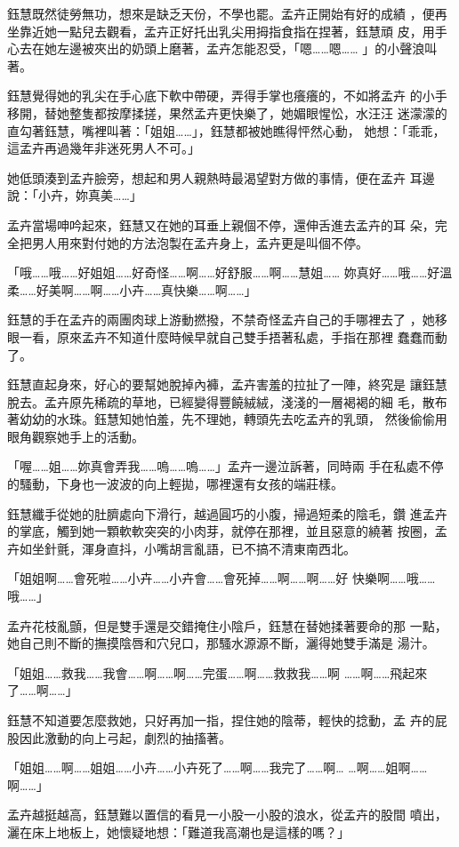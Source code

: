 鈺慧既然徒勞無功，想來是缺乏天份，不學也罷。孟卉正開始有好的成績
，便再坐靠近她一點兒去觀看，孟卉正好托出乳尖用拇指食指在捏著，鈺慧頑
皮，用手心去在她左邊被夾出的奶頭上磨著，孟卉怎能忍受，「嗯……嗯……
」的小聲浪叫著。

鈺慧覺得她的乳尖在手心底下軟中帶硬，弄得手掌也癢癢的，不如將孟卉
的小手移開，替她整隻都按摩揉搓，果然孟卉更快樂了，她媚眼惺忪，水汪汪
迷濛濛的直勾著鈺慧，嘴裡叫著：「姐姐……」，鈺慧都被她瞧得怦然心動，
她想：「乖乖，這孟卉再過幾年非迷死男人不可。」

她低頭湊到孟卉臉旁，想起和男人親熱時最渴望對方做的事情，便在孟卉
耳邊說：「小卉，妳真美……」

孟卉當場呻吟起來，鈺慧又在她的耳垂上親個不停，還伸舌進去孟卉的耳
朵，完全把男人用來對付她的方法泡製在孟卉身上，孟卉更是叫個不停。

「哦……哦……好姐姐……好奇怪……啊……好舒服……啊……慧姐……
妳真好……哦……好溫柔……好美啊……啊……小卉……真快樂……啊……」

鈺慧的手在孟卉的兩團肉球上游動撚撥，不禁奇怪孟卉自己的手哪裡去了
，她移眼一看，原來孟卉不知道什麼時候早就自己雙手捂著私處，手指在那裡
蠢蠢而動了。

鈺慧直起身來，好心的要幫她脫掉內褲，孟卉害羞的拉扯了一陣，終究是
讓鈺慧脫去。孟卉原先稀疏的草地，已經變得豐饒絨絨，淺淺的一層褐褐的細
毛，散布著幼幼的水珠。鈺慧知她怕羞，先不理她，轉頭先去吃孟卉的乳頭，
然後偷偷用眼角觀察她手上的活動。

「喔……姐……妳真會弄我……嗚……嗚……」孟卉一邊泣訴著，同時兩
手在私處不停的騷動，下身也一波波的向上輕拋，哪裡還有女孩的端莊樣。

鈺慧纖手從她的肚臍處向下滑行，越過圓巧的小腹，掃過短柔的陰毛，鑽
進孟卉的掌底，觸到她一顆軟軟突突的小肉芽，就停在那裡，並且惡意的繞著
按圈，孟卉如坐針氈，渾身直抖，小嘴胡言亂語，已不搞不清東南西北。

「姐姐啊……會死啦……小卉……小卉會……會死掉……啊……啊……好
快樂啊……哦……哦……」

孟卉花枝亂顫，但是雙手還是交錯掩住小陰戶，鈺慧在替她揉著要命的那
一點，她自己則不斷的撫摸陰唇和穴兒口，那騷水源源不斷，灑得她雙手滿是
湯汁。

「姐姐……救我……我會……啊……啊……完蛋……啊……救救我……啊
……啊……飛起來了……啊……」

鈺慧不知道要怎麼救她，只好再加一指，捏住她的陰蒂，輕快的捻動，孟
卉的屁股因此激動的向上弓起，劇烈的抽搐著。

「姐姐……啊……姐姐……小卉……小卉死了……啊……我完了……啊…
…啊……姐啊……啊……」

孟卉越挺越高，鈺慧難以置信的看見一小股一小股的浪水，從孟卉的股間
噴出，灑在床上地板上，她懷疑地想：「難道我高潮也是這樣的嗎？」


